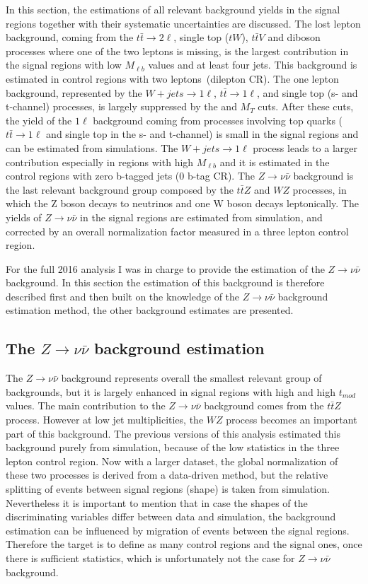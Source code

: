 In this section, the estimations of all relevant background yields in the signal regions together with their systematic uncertainties are discussed. The lost lepton background, coming from the $t\bar{t} \to 2 \ell$, single top ($tW$), $t\bar{t}V$ and diboson processes where one of the two leptons is missing, is the largest contribution in the signal regions with low $M_{\ell b}$ values and at least four jets. This background is estimated in control regions with two leptons~(dilepton CR). The one lepton background, represented by the $W+jets \to 1\ell$, $t\bar{t} \to 1\ell$, and single top (s- and t-channel) processes, is largely suppressed by the \MET and $M_{T}$ cuts. After these cuts, the yield of the $1\ell$ background coming from processes involving top quarks ($t\bar{t} \to 1\ell$ and single top in the s- and t-channel) is small in the signal regions  and can be estimated from simulations. The $W+jets \to 1\ell$  process leads to a larger contribution especially in regions with high $M_{\ell b}$ and it is estimated in the control regions with zero b-tagged jets (0 b-tag CR). The $Z \to \nu \bar{\nu}$ background is the last relevant background group composed by the $t\bar{t}Z$ and $WZ$ processes, in which the Z boson decays to neutrinos and one W boson decays leptonically. The yields of $Z \to \nu \bar{\nu}$ in the signal regions are estimated from simulation, and corrected by an overall normalization factor measured in a three lepton control region.  

For the full 2016 analysis I was in charge to provide the estimation of the $Z \to \nu \bar{\nu}$ background. In this section the estimation of this background is therefore described first and then built on the knowledge of the $Z \to \nu \bar{\nu}$ background estimation method, the other background estimates are presented.


\subsection{The $Z \to \nu \bar{\nu}$ background estimation}

The $Z \to \nu \bar{\nu}$ background represents overall the smallest relevant group of backgrounds, but it is largely enhanced in signal regions with high \MET and high $t_{mod}$ values. The main contribution to the $Z \to \nu \bar{\nu}$ background comes from the $t\bar{t}Z$ process. However at low jet multiplicities, the $WZ$ process becomes an important part of this background.  The previous versions of this analysis estimated this background purely from simulation, because of the low statistics in the three lepton control region. Now with a larger dataset, the global normalization of these two processes is derived from a data-driven method, but the relative splitting of events between signal regions (shape) is taken from simulation. Nevertheless it is important to mention that in case the shapes of the discriminating variables differ between data and simulation, the background estimation can be influenced by migration of events between the signal regions. Therefore the target is to define as many control regions and the signal ones, once there is sufficient statistics, which is unfortunately not the case for $Z \to \nu \bar{\nu}$ background. 


